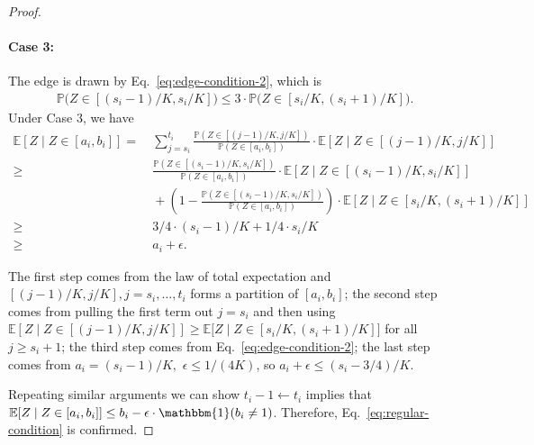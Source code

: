 \documentclass[11pt]{article}
\theoremstyle{statplain}
\theoremstyle{statdefinition}
\newcommand{\ra}{\rightarrow}
\newcommand{\la}{\leftarrow}
\newcommand{\E}{\mathbb{E}}
\newcommand{\PP}{\mathbb{P}}
\newcommand{\0}{\mathbf{0}}
\newcommand{\discreteNum}{K} %
\begin{document}
\begin{proof}
\paragraph{Case 3: } 
The edge is drawn by Eq.~\eqref{eq:edge-condition-2}, which is
\begin{align*}
    \PP\Big(Z \in [(s_i-1)/\discreteNum, s_i/\discreteNum]\Big) \leq 3 \cdot \PP\Big(Z \in [s_i/\discreteNum, (s_i+1)/\discreteNum]\Big).
\end{align*}
Under Case 3, we have
\begin{align*}
    \E[Z\mid Z \in [a_i,b_i]] = &~ \sum_{j=s_i}^{t_i} \frac{\PP(Z \in [(j-1)/\discreteNum, j/\discreteNum])}{\PP(Z \in [a_i,b_i])} \cdot \E[Z \mid Z \in [(j-1)/\discreteNum, j/\discreteNum]]\\
    \geq &~ \frac{\PP(Z \in [(s_i-1)/\discreteNum, s_i/\discreteNum])}{\PP(Z \in [a_i,b_i])} \cdot \E[Z \mid Z \in [(s_i-1)/\discreteNum, s_i/\discreteNum]] \\
    &~ + \left(1-\frac{\PP(Z \in [(s_i-1)/\discreteNum, s_i/\discreteNum])}{\PP(Z \in [a_i,b_i])}\right) \cdot \E[Z \mid Z \in [s_i/\discreteNum, (s_i+1)/\discreteNum]] \\
    \geq &~ 3/4 \cdot (s_i-1)/\discreteNum + 1/4 \cdot s_i/\discreteNum\\
    \ge &~ a_i + \epsilon. 
\end{align*}

The first step comes from the law of total expectation and $[(j-1)/\discreteNum, j/\discreteNum], j=s_i,\dots, t_i$ forms a partition of $[a_i,b_i]$; the second step comes from pulling the first term out $j=s_i$ and then using $\E[Z\mid Z \in [(j-1)/\discreteNum, j/\discreteNum]] \geq \E\Big[Z\mid Z \in [s_i/\discreteNum, (s_i+1)/\discreteNum]\Big]$ for all $j \geq s_i+1$; the third step comes from Eq.~\eqref{eq:edge-condition-2}; the last step comes from $a_i = (s_i-1)/\discreteNum,$ $ \epsilon \le 1/(4\discreteNum)$, so $ a_i + \epsilon \le (s_i-3/4)/\discreteNum$.


Repeating similar arguments we can show $t_i - 1 \la t_i $ implies that $\E[Z\mid Z \in [a_i,b_i]] \leq b_i - \epsilon \cdot \mathbbm{1}(b_i \neq 1)$. Therefore, Eq.~\eqref{eq:regular-condition} is confirmed. 



\end{proof}
\end{document}
